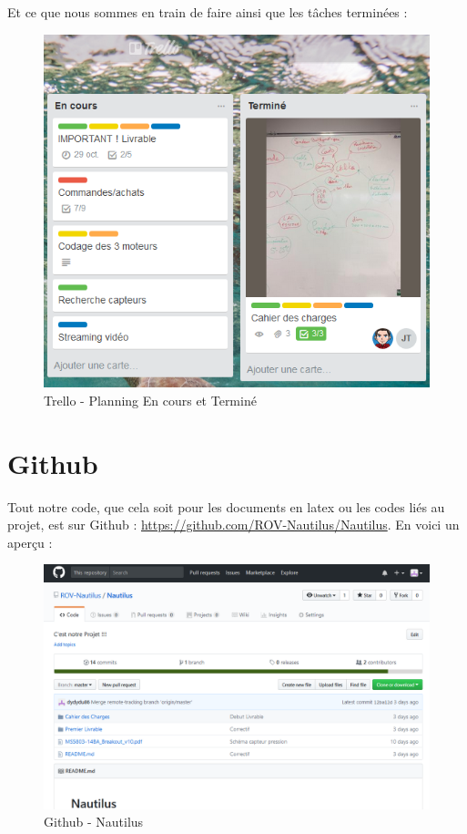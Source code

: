 \documentclass[a4paper,11pt]{report}
\begin{document}
						\newpage Et ce que nous sommes en train de faire ainsi que les tâches terminées :
						\begin{figure}[!h]
							\begin{center}
								\includegraphics[scale=0.5]{Illustrations/Planning2.png}
								\caption{Trello - Planning En cours et Terminé}
							\end{center}
						\end{figure}
						
        \section{Github}
				Tout notre code, que cela soit pour les documents en latex ou les codes liés au projet, est sur Github :
				\url{https://github.com/ROV-Nautilus/Nautilus}.
				\newline En voici un aperçu :
					\begin{figure}[!h]
							\begin{center}
								\includegraphics[scale=0.4]{Illustrations/Github.png}
								\caption{Github - Nautilus}
							\end{center}
						\end{figure}
				
\end{document}
